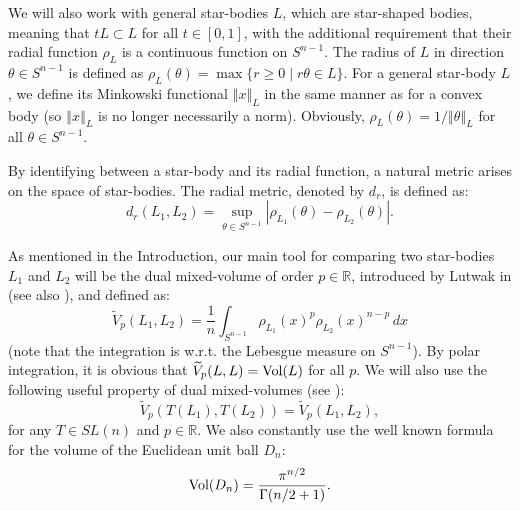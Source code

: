 \documentclass[12pt,oneside]{amsart}
\theoremstyle{definition}
\theoremstyle{remark}
\theoremstyle{proof}
\numberwithin{equation}{section}
\newcommand{\norm}[1]{\left\Vert#1\right\Vert}
\newcommand{\abs}[1]{\left\vert#1\right\vert}
\newcommand{\Real}{\mathbb{R}}
\newcommand{\Vol}[1]{\textnormal{Vol} (#1)}
\begin{document}
We will also work with general star-bodies $L$, which are
star-shaped bodies, meaning that $tL \subset L$ for all $t \in
[0,1]$, with the additional requirement that their radial
function $\rho_L$ is a continuous function on $S^{n-1}$. The
radius of $L$ in direction $\theta \in S^{n-1}$ is defined as
$\rho_L(\theta) = \max \{\mbox{$r \geq 0$} \; | \; r\theta \in L
\}$. For a general star-body $L$, we define its Minkowski
functional $\norm{x}_L$ in the same manner as for a convex body
(so $\norm{x}_L$ is no longer necessarily a norm). Obviously,
$\rho_L(\theta) = 1/\norm{\theta}_L$ for all $\theta \in S^{n-1}$.


By identifying between a star-body and its radial function, a
natural metric arises on the space of star-bodies. The radial
metric, denoted by $d_r$, is defined as:
\[
d_r(L_1,L_2) = \sup_{\theta \in S^{n-1}} \abs{\rho_{L_1}(\theta)-
\rho_{L_2}(\theta)}.
\]

As mentioned in the Introduction, our main tool for comparing two
star-bodies $L_1$ and $L_2$ will be the dual mixed-volume of
order $p \in \Real$, introduced by Lutwak in
\cite{Lutwak-dual-mixed-volumes} (see also
\cite{Lutwak-intersection-bodies}), and defined as:
\[
\widetilde{V}_p(L_1,L_2) = \frac{1}{n} \int_{S^{n-1}}
\rho_{L_1}(x)^p \rho_{L_2}(x)^{n-p} \, dx
\]
(note that the integration is w.r.t. the Lebesgue measure on
$S^{n-1}$). By polar integration, it is obvious that
$\widetilde{V}_p(L,L) = \Vol{L}$ for all $p$. We will also use
the following useful property of dual mixed-volumes (see
\cite{Lutwak-intersection-bodies}):
\begin{equation} \label{eq:dmv-property}
\widetilde{V}_p(T(L_1),T(L_2)) = \widetilde{V}_p(L_1,L_2),
\end{equation}
for any $T \in SL(n)$ and $p \in \Real$. We also constantly use
the well known formula for the volume of the Euclidean unit ball
$D_n$:
\begin{equation} \label{eq:ball-volume-formula}
\Vol{D_n} = \frac{\pi^{n/2}}{\Gamma(n/2+1)}.
\end{equation}
\end{document}
